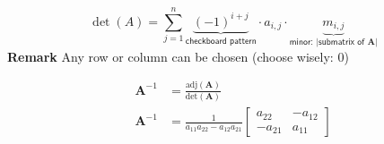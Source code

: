 \noindent\begin{equation*}
    \det(A)=\sum_{j=1}^n \underbrace{{(-1)}^{i+j}}_{\textsf{checkboard pattern}}\cdot a_{i,j}\cdot\underbrace{m_{i,j}}_{\textsf{minor: |submatrix of }\mathbf{A}|}
\end{equation*}
\textbf{Remark} Any row or column can be chosen (choose wisely: 0)

\newpar{}

\begin{align*}
    \mathbf{A}^{-1} & = \frac{\text{adj}(\mathbf{A})}{\text{det}(\mathbf{A})} \\
    \mathbf{A}^{-1} & = \frac{1}{a_{11}a_{22} - a_{12}a_{21}}
    \begin{bmatrix}
        a_{22}  & - a_{12} \\
        -a_{21} & a_{11}
    \end{bmatrix}
\end{align*}